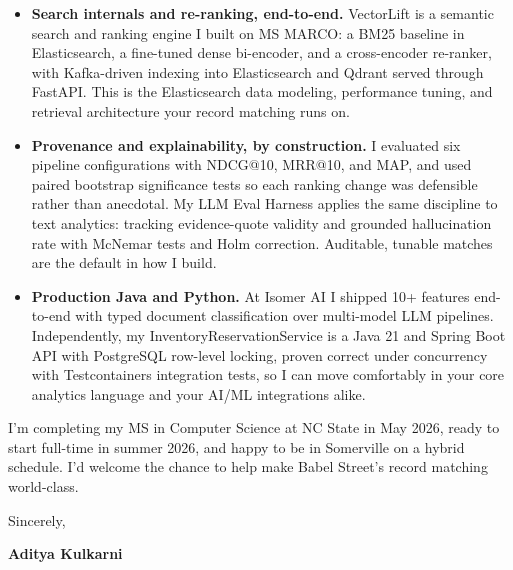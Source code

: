\documentclass[11pt]{article}
\begin{document}
\begin{itemize}[leftmargin=*, label={\textcolor{accent}{\faAngleRight}}, itemsep=4pt]
  \item \textbf{Search internals and re-ranking, end-to-end.} VectorLift is a semantic search and ranking engine I built on MS MARCO: a BM25 baseline in Elasticsearch, a fine-tuned dense bi-encoder, and a cross-encoder re-ranker, with Kafka-driven indexing into Elasticsearch and Qdrant served through FastAPI. This is the Elasticsearch data modeling, performance tuning, and retrieval architecture your record matching runs on.

  \item \textbf{Provenance and explainability, by construction.} I evaluated six pipeline configurations with NDCG@10, MRR@10, and MAP, and used paired bootstrap significance tests so each ranking change was defensible rather than anecdotal. My LLM Eval Harness applies the same discipline to text analytics: tracking evidence-quote validity and grounded hallucination rate with McNemar tests and Holm correction. Auditable, tunable matches are the default in how I build.

  \item \textbf{Production Java and Python.} At Isomer AI I shipped 10+ features end-to-end with typed document classification over multi-model LLM pipelines. Independently, my InventoryReservationService is a Java 21 and Spring Boot API with PostgreSQL row-level locking, proven correct under concurrency with Testcontainers integration tests, so I can move comfortably in your core analytics language and your AI/ML integrations alike.
\end{itemize}

\vspace{8pt}
I'm completing my MS in Computer Science at NC State in May 2026, ready to start full-time in summer 2026, and happy to be in Somerville on a hybrid schedule. I'd welcome the chance to help make Babel Street's record matching world-class.

\vspace{10pt}
Sincerely,

\vspace{4pt}
\textbf{Aditya Kulkarni}
\end{document}
